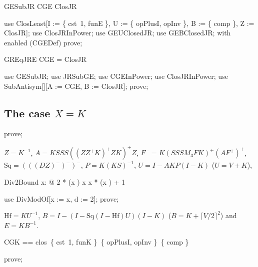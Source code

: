 \documentclass{article}
\begin{document}
\begin{theorem}{GESubJR}
  CGE \subseteq ClosJR
\end{theorem}

\begin{zproof}
use ClosLeast[I := \{ cst~1, funE \}, U := \{ opPlusI, opInv \}, B := \{ comp \}, Z := ClosJR];
use ClosJRInPower;
use GEUClosedJR;
use GEBClosedJR;
with enabled (CGEDef) prove;
\end{zproof}

\begin{theorem}{GREqJRE}
  CGE = ClosJR
\end{theorem}

\begin{zproof}
use GESubJR;
use JRSubGE;
use CGEInPower;
use ClosJRInPower;
use SubAntisym[\nat \fun \nat][A := CGE, B := ClosJR];
prove;
\end{zproof}

\subsection{The case $X = K$}


\begin{zproof}
prove;
\end{zproof}


$Z = K^{-1}$, $A = K S S S ((Z Z^+ K)^+ Z K)^+ Z$, $F^- = K (S S S M_3 F K)^+ (A F^+)^+$,
$\mathrm{Sq} = (((D Z)^-)^-)^-$, $P = K (K S)^{-1}$, $U = I - A K P (I - K)$ ($U = V + K$),
\begin{theorem}{Div2Bound}
  \forall x: \nat @ 2 * (x ) \leq x \land x  * (x ) + 1
\end{theorem}

\begin{zproof}
use DivModOf[x := x, d := 2];
prove;
\end{zproof}

$\mathrm{Hf} = K U^{-1}$, $B = I - (I - \mathrm{Sq} (I - \mathrm{Hf}) U)(I - K)$
($B = K + \lceil V/2 \rceil^2$) and $E = K B^{-1}$.

\begin{zed}
  CGK == clos~\{ cst~1, funK \}~\{ opPlusI, opInv \}~\{ comp \}
\end{zed}

\begin{zproof}
prove;
\end{zproof}
\end{document}
